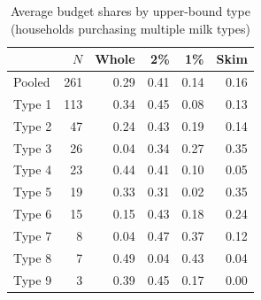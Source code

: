\begin{table}[htbp]
\centering
\caption{Average budget shares by upper-bound type (households purchasing multiple milk types)}
\label{tab:groupshares_households}
\begin{tabular}{lrrrrr}
\toprule
 & $N$ & Whole & 2\% & 1\% & Skim \\
\midrule
Pooled & 261 & 0.29 & 0.41 & 0.14 & 0.16 \\
\midrule
Type 1 & 113 & 0.34 & 0.45 & 0.08 & 0.13 \\
Type 2 & 47 & 0.24 & 0.43 & 0.19 & 0.14 \\
Type 3 & 26 & 0.04 & 0.34 & 0.27 & 0.35 \\
Type 4 & 23 & 0.44 & 0.41 & 0.10 & 0.05 \\
Type 5 & 19 & 0.33 & 0.31 & 0.02 & 0.35 \\
Type 6 & 15 & 0.15 & 0.43 & 0.18 & 0.24 \\
Type 7 & 8 & 0.04 & 0.47 & 0.37 & 0.12 \\
Type 8 & 7 & 0.49 & 0.04 & 0.43 & 0.04 \\
Type 9 & 3 & 0.39 & 0.45 & 0.17 & 0.00 \\
\bottomrule
\end{tabular}
\end{table}
